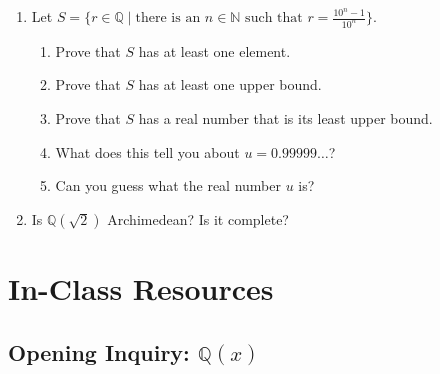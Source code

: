 \documentclass[11pt]{article}
\theoremstyle{definition}
\begin{document}
\begin{enumerate}
\item Let $S=\{r\in \mathbb{Q} \mid\text{there is an } n\in \mathbb{N} \text{ such that }r=\frac{10^{n}-1}{10^{n}}\}$.
\begin{enumerate}
\item Prove that $S$ has at least one element.
\item Prove that $S$ has at least one upper bound.
\item Prove that $S$ has a real number that is its least upper bound.
\item What does this tell you about $u=0.99999\dots$?
\item Can you guess what the real number $u$ is?
\end{enumerate}

\item Is $\mathbb{Q}(\sqrt{2})$ Archimedean? Is it complete?

\end{enumerate}

\section{In-Class Resources}

\newpage 
\subsection*{Opening Inquiry: $\mathbb{Q}(x)$}
\end{document}
